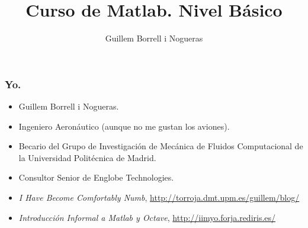 \documentclass[12pt]{beamer}
\title{Curso de Matlab.  Nivel Básico}
\author{Guillem Borrell i Nogueras}
\begin{document}

\begin{frame}
  \titlepage
\end{frame}

\begin{frame}
  \frametitle{Yo.}
  \begin{itemize}
  \item Guillem Borrell i Nogueras.
  \item Ingeniero Aeronáutico (aunque no me gustan los aviones).
  \item Becario del Grupo de Investigación de Mecánica de Fluidos
    Computacional de la Universidad Politécnica de Madrid.
  \item Consultor Senior de Englobe Technologies.
  \item \textit{I Have Become Comfortably Numb},
    \url{http://torroja.dmt.upm.es/guillem/blog/}
  \item \textit{Introducción Informal a Matlab y Octave},
    \url{http://iimyo.forja.rediris.es/}
  \end{itemize}
\end{frame}
\end{document}
